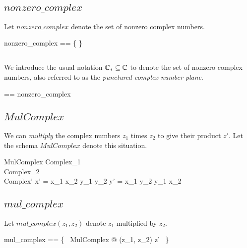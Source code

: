 \documentclass[11pt, oneside]{article}
\begin{document}
\subsection{$nonzero\_complex$}

Let $nonzero\_complex$ denote the set of nonzero complex numbers.

\begin{zed}
	nonzero\_complex == \C \setminus \{ \zeroC \}
\end{zed}

\subsection{}

We introduce the usual notation $\mathbb{C}_{*} \subseteq \mathbb{C}$ to denote the set of nonzero complex numbers,
also referred to as the \textit{punctured complex number plane}.

\begin{zed}
	\Cnz == nonzero\_complex
\end{zed}

\subsection{$MulComplex$}

We can \textit{multiply} the complex numbers $z_1$ times $z_2$ to give their product $z'$.
Let the schema $MulComplex$ denote this situation.

\begin{schema}{MulComplex}
	Complex_1 \\
	Complex_2 \\
	Complex'
\where
	x' = x_1 \mulR x_2 \subR y_1 \mulR y_2
\also
	y' = x_1 \mulR y_2 \addR y_1 \mulR x_2
\end{schema}

\subsection{$mul\_complex$}

Let $mul\_complex(z_1, z_2)$ denote $z_1$ multiplied by $z_2$.

\begin{zed}
	mul\_complex == \{~ MulComplex @ (z_1, z_2) \mapsto z' ~\}
\end{zed}

\subsection{}
\end{document}
